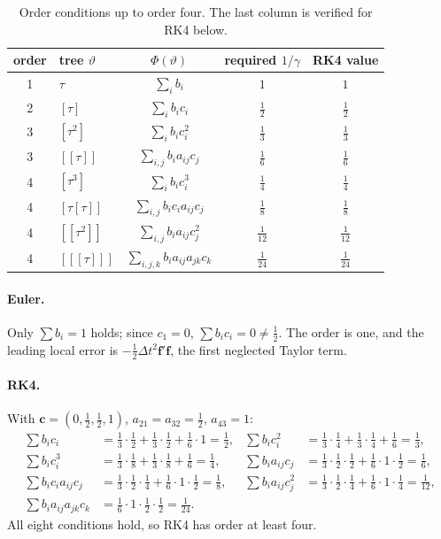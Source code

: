 \documentclass[11pt,a4paper]{article}
\newcommand{\Dt}{\Delta t}
\newcommand{\bff}{\mathbf{f}}
\begin{document}
\begin{table}[H]
\centering
\begin{tabular}{@{}clccc@{}}
\toprule
order & tree $\vartheta$ & $\Phi(\vartheta)$ & required $1/\gamma$ & RK4 value\\
\midrule
1 & $\tau$ & $\sum_i b_i$ & $1$ & $1$\\
2 & $[\tau]$ & $\sum_i b_ic_i$ & $\tfrac12$ & $\tfrac12$\\
3 & $[\tau^2]$ & $\sum_i b_ic_i^2$ & $\tfrac13$ & $\tfrac13$\\
3 & $[[\tau]]$ & $\sum_{i,j} b_ia_{ij}c_j$ & $\tfrac16$ & $\tfrac16$\\
4 & $[\tau^3]$ & $\sum_i b_ic_i^3$ & $\tfrac14$ & $\tfrac14$\\
4 & $[\tau[\tau]]$ & $\sum_{i,j} b_ic_ia_{ij}c_j$ & $\tfrac18$ & $\tfrac18$\\
4 & $[[\tau^2]]$ & $\sum_{i,j} b_ia_{ij}c_j^2$ & $\tfrac1{12}$ & $\tfrac1{12}$\\
4 & $[[[\tau]]]$ & $\sum_{i,j,k} b_ia_{ij}a_{jk}c_k$ & $\tfrac1{24}$ & $\tfrac1{24}$\\
\bottomrule
\end{tabular}
\caption{Order conditions up to order four. The last column is verified for RK4 below.}
\label{tab:orderconds}
\end{table}

\paragraph{Euler.} Only $\sum b_i=1$ holds; since $c_1=0$, $\sum b_ic_i=0\ne\tfrac12$. The order is one, and the
leading local error is $-\tfrac12\Dt^2\bff'\bff$, the first neglected Taylor term.

\paragraph{RK4.} With $\mathbf c=(0,\tfrac12,\tfrac12,1)$, $a_{21}=a_{32}=\tfrac12$, $a_{43}=1$:
\begin{align*}
\sum b_i c_i&=\tfrac13\cdot\tfrac12+\tfrac13\cdot\tfrac12+\tfrac16\cdot1=\tfrac12, &
\sum b_i c_i^2&=\tfrac13\cdot\tfrac14+\tfrac13\cdot\tfrac14+\tfrac16=\tfrac13,\\
\sum b_i c_i^3&=\tfrac13\cdot\tfrac18+\tfrac13\cdot\tfrac18+\tfrac16=\tfrac14, &
\sum b_i a_{ij}c_j&=\tfrac13\cdot\tfrac12\cdot\tfrac12+\tfrac16\cdot1\cdot\tfrac12=\tfrac16,\\
\sum b_ic_ia_{ij}c_j&=\tfrac13\cdot\tfrac12\cdot\tfrac14+\tfrac16\cdot1\cdot\tfrac12=\tfrac18, &
\sum b_ia_{ij}c_j^2&=\tfrac13\cdot\tfrac12\cdot\tfrac14+\tfrac16\cdot1\cdot\tfrac14=\tfrac1{12},\\
\sum b_ia_{ij}a_{jk}c_k&=\tfrac16\cdot1\cdot\tfrac12\cdot\tfrac12=\tfrac1{24}. &&
\end{align*}
All eight conditions hold, so RK4 has order at least four.
\end{document}
